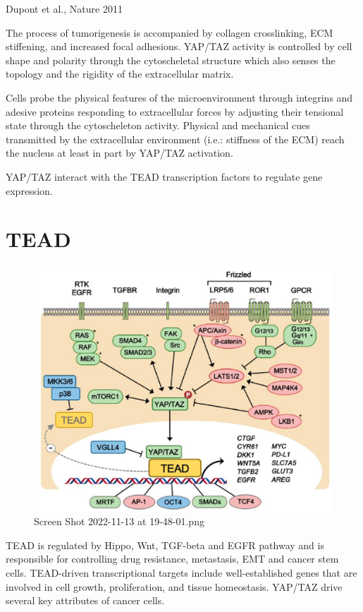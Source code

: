 Dupont et al., Nature 2011

The process of tumorigenesis is accompanied by collagen crosslinking, ECM stiffening, and increased focal adhesions. YAP/TAZ activity is controlled by cell shape and polarity through the cytoscheletal structure which also senses the topology and the rigidity of the extracellular matrix.

Cells probe the physical features of the microenvironment through integrins and adesive proteins responding to extracellular forces by adjusting their tensional state through the cytoscheleton activity. Physical and mechanical cues transmitted by the extracellular environment (i.e.: stiffness of the ECM) reach the nucleus at least in part by YAP/TAZ activation.

YAP/TAZ interact with the TEAD transcription factors to regulate gene expression.

\hypertarget{tead}{%
\section{TEAD}\label{tead}}

\begin{figure}
\centering
\includegraphics{../_resources/Screen_Shot_2022-11-13_at_19-48-01.png}
\caption{Screen Shot 2022-11-13 at 19-48-01.png}
\end{figure}

TEAD is regulated by Hippo, Wnt, TGF-beta and EGFR pathway and is responsible for controlling drug resistance, metastasis, EMT and cancer stem cells. TEAD-driven transcriptional targets include well-established genes that are involved in cell growth, proliferation, and tissue homeostasis. YAP/TAZ drive several key attributes of cancer cells.

